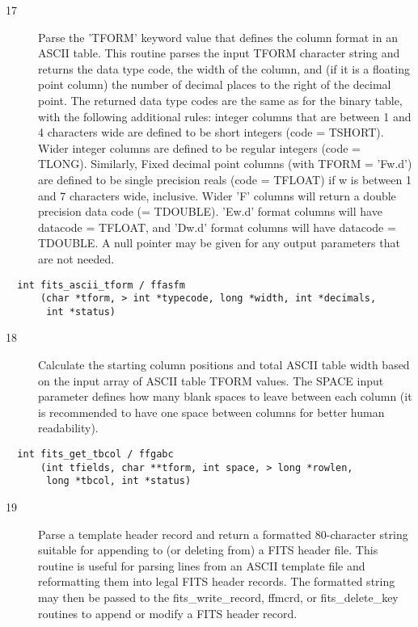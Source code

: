 \documentclass[11pt]{book}
\begin{document}
\begin{description}
\item[17] Parse the 'TFORM' keyword value that defines the column format in
    an ASCII table.  This routine parses the input TFORM character
    string and returns the data type code, the width of the column,
    and (if it is a floating point column) the number of decimal places
    to the right of the decimal point.  The returned data type codes are
    the same as for the binary table, with the following
    additional rules:  integer columns that are between 1 and 4 characters
    wide are defined to be short integers (code = TSHORT).  Wider integer
    columns are defined to be regular integers (code = TLONG).  Similarly,
    Fixed decimal point columns (with TFORM = 'Fw.d') are defined to
    be single precision reals (code = TFLOAT) if w is between 1 and 7 characters
    wide, inclusive.  Wider 'F' columns will return a double precision
    data code (= TDOUBLE).  'Ew.d' format columns will have datacode = TFLOAT,
    and 'Dw.d' format columns will have datacode = TDOUBLE. A null
   pointer may be given for any output parameters that are not needed. \label{ffasfm}
\end{description}

\begin{verbatim}
  int fits_ascii_tform / ffasfm
      (char *tform, > int *typecode, long *width, int *decimals,
       int *status)
\end{verbatim}

\begin{description}
\item[18] Calculate the starting column positions and total ASCII table width
    based on the input array of ASCII table TFORM values.  The SPACE input
    parameter defines how many blank spaces to leave between each column
    (it is recommended to have one space between columns for better human
   readability). \label{ffgabc}
\end{description}

\begin{verbatim}
  int fits_get_tbcol / ffgabc
      (int tfields, char **tform, int space, > long *rowlen,
       long *tbcol, int *status)
\end{verbatim}

\begin{description}
\item[19] Parse a template header record and return a formatted 80-character string
    suitable for appending to (or deleting from) a FITS header file.
    This routine is useful for parsing lines from an ASCII template file
    and reformatting them into legal FITS header records.  The formatted
    string may then be passed to the fits\_write\_record, ffmcrd, or
    fits\_delete\_key routines
   to append or modify a FITS header record. \label{ffgthd}
\end{description}
\end{document}
